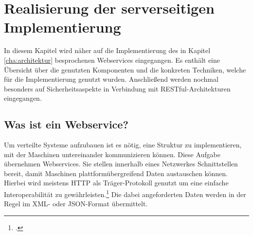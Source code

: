 \chapter{Realisierung der serverseitigen Implementierung}
\label{cha:server-impl}
In diesem Kapitel wird näher auf die Implementierung des in Kapitel \ref{cha:architektur} besprochenen Webservices eingegangen. Es enthält eine Übersicht über die genutzten Komponenten und die konkreten Techniken, welche für die Implementierung genutzt wurden. Anschließend werden nochmal besonders auf Sicherheitsaspekte in Verbindung mit RESTful-Architekturen eingegangen. 
\section{Was ist ein Webservice?}
\label{sec:definition-webservice}
Um verteilte Systeme aufzubauen ist es nötig, eine Struktur zu implementieren, mit der Maschinen untereinander kommunizieren können. Diese Aufgabe übernehmen Webservices. Sie stellen innerhalb eines Netzwerkes Schnittstellen bereit, damit Maschinen plattformübergreifend Daten austauschen können. Hierbei wird meistens HTTP als Träger-Protokoll genutzt um eine einfache Interoperabilität zu gewährleisten.\footcite{Definition-Webservice} Die dabei angeforderten Daten werden in der Regel im XML- oder JSON-Format übermittelt. 
